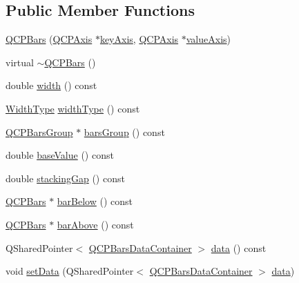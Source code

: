 \subsection*{Public Member Functions}
\begin{DoxyCompactItemize}
\item 
\mbox{\hyperlink{class_q_c_p_bars_a64006999ad9dff308f40df41cef176ad}{Q\+C\+P\+Bars}} (\mbox{\hyperlink{class_q_c_p_axis}{Q\+C\+P\+Axis}} $\ast$\mbox{\hyperlink{class_q_c_p_abstract_plottable_a2cdd6f0dd5e9a979037f86b4000d9cfe}{key\+Axis}}, \mbox{\hyperlink{class_q_c_p_axis}{Q\+C\+P\+Axis}} $\ast$\mbox{\hyperlink{class_q_c_p_abstract_plottable_af47809a644a68ffd955fb30b01fb4f2f}{value\+Axis}})
\item 
virtual \mbox{\hyperlink{class_q_c_p_bars_a4d880e28031ef120603f543379be2f22}{$\sim$\+Q\+C\+P\+Bars}} ()
\item 
double \mbox{\hyperlink{class_q_c_p_bars_abe7eb3987d8711f45829db879aee2280}{width}} () const
\item 
\mbox{\hyperlink{class_q_c_p_bars_a65dbbf1ab41cbe993d71521096ed4649}{Width\+Type}} \mbox{\hyperlink{class_q_c_p_bars_a4c103fb405a45f47853e0345f0c6e708}{width\+Type}} () const
\item 
\mbox{\hyperlink{class_q_c_p_bars_group}{Q\+C\+P\+Bars\+Group}} $\ast$ \mbox{\hyperlink{class_q_c_p_bars_a5eef59840b68d205df4e0c3df5f97633}{bars\+Group}} () const
\item 
double \mbox{\hyperlink{class_q_c_p_bars_a29a7b3b86f80b2a04bd1f9ec0ebaf422}{base\+Value}} () const
\item 
double \mbox{\hyperlink{class_q_c_p_bars_a2e6192fa9c16df7ba94cd50c0c9ec7ce}{stacking\+Gap}} () const
\item 
\mbox{\hyperlink{class_q_c_p_bars}{Q\+C\+P\+Bars}} $\ast$ \mbox{\hyperlink{class_q_c_p_bars_a1b58664864b141f45e02044a855b3213}{bar\+Below}} () const
\item 
\mbox{\hyperlink{class_q_c_p_bars}{Q\+C\+P\+Bars}} $\ast$ \mbox{\hyperlink{class_q_c_p_bars_ab97f2acd9f6cb40d2cc3c33d278f0e78}{bar\+Above}} () const
\item 
Q\+Shared\+Pointer$<$ \mbox{\hyperlink{qcustomplot_8h_a52bf589c9fce1baa36c1d40d69785d46}{Q\+C\+P\+Bars\+Data\+Container}} $>$ \mbox{\hyperlink{class_q_c_p_bars_a7e373a534d82e18ed27b3fafd1f08fae}{data}} () const
\item 
void \mbox{\hyperlink{class_q_c_p_bars_a6dc562ec7120a8521e1061f2134367e4}{set\+Data}} (Q\+Shared\+Pointer$<$ \mbox{\hyperlink{qcustomplot_8h_a52bf589c9fce1baa36c1d40d69785d46}{Q\+C\+P\+Bars\+Data\+Container}} $>$ \mbox{\hyperlink{class_q_c_p_bars_a7e373a534d82e18ed27b3fafd1f08fae}{data}})

\end{DoxyCompactItemize}
